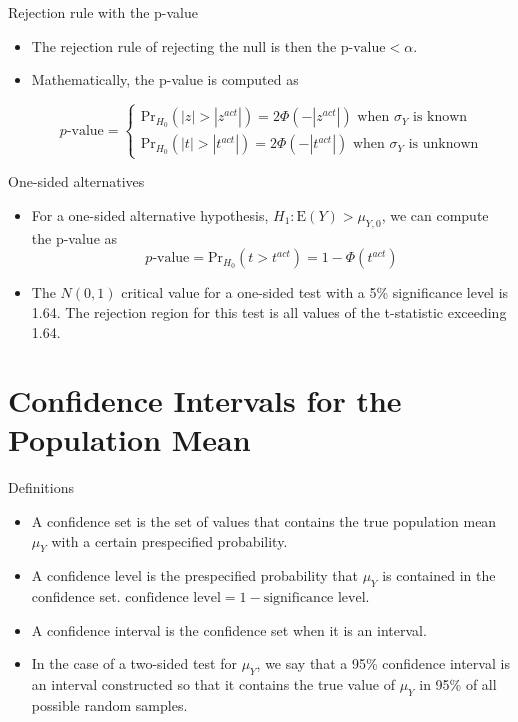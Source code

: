 \documentclass[presentation]{beamer}
\begin{document}
\begin{frame}[label={sec:org7169bf1}]{Rejection rule with the p-value}
\begin{itemize}
\item The rejection rule of rejecting the null is then
the \(\text{p-value} < \alpha\).

\item Mathematically, the p-value is computed as

\begin{equation*}
p\text{-value} = 
\begin{cases}
\mathrm{Pr}_{H_0}\left(|z| > |z^{act}|\right)=2\Phi(-|z^{act}|) \text{ when } \sigma_Y \text{ is known} \\
\mathrm{Pr}_{H_0}\left(|t| > |t^{act}|\right)=2\Phi(-|t^{act}|) \text{ when } \sigma_Y \text{ is unknown}
\end{cases}
\end{equation*}
\end{itemize}
\end{frame}

\begin{frame}[label={sec:org4ab8b28}]{One-sided alternatives}
\begin{itemize}
\item For a one-sided alternative hypothesis, \(H_1: \mathrm{E}(Y) >
  \mu_{Y,0}\), we can compute the p-value as
\[ p\text{-value} = \mathrm{Pr}_{H_0}(t > t^{act}) = 1 - \Phi(t^{act}) \]

\item The \(N(0, 1)\) critical value for a one-sided test with a 5\%
significance level is 1.64. The rejection region for this test is all
values of the t-statistic exceeding 1.64.
\end{itemize}
\end{frame}


\section{Confidence Intervals for the Population Mean}
\label{sec:orgeeb49e9}

\begin{frame}[label={sec:org033d5f4}]{Definitions}
\begin{itemize}
\item A \alert{confidence set} is the set of values that contains the true
population mean \(\mu_Y\) with a certain prespecified probability.

\item A \alert{confidence level} is the prespecified probability that \(\mu_Y\) is
contained in the confidence set. \(\text{confidence level} = 1 -
  \text{significance level}\).

\item A \alert{confidence interval} is the confidence set when it is an
interval.

\item In the case of a two-sided test for \(\mu_Y\), we say that a 95\%
confidence interval is an interval constructed so that it contains
the true value of \(\mu_Y\) in 95\% of all possible random samples.
\end{itemize}
\end{frame}
\end{document}
